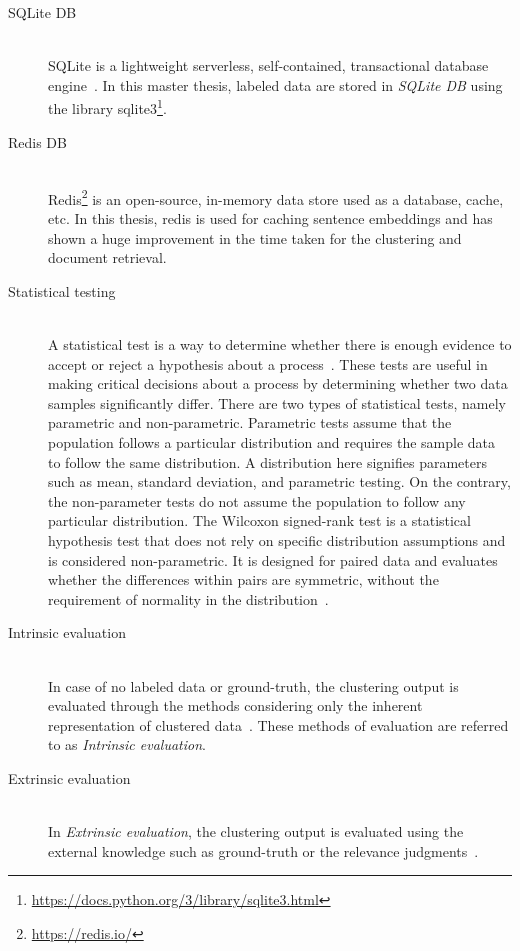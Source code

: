 \begin{description}
	
	\item[SQLite DB] \hfill \\ SQLite is a lightweight serverless, self-contained, transactional database engine~\cite{bhosale2015sqlite}. In this master thesis, labeled data are stored in \textit{SQLite DB} using the library sqlite3\footnote{\url{https://docs.python.org/3/library/sqlite3.html}}.
	
	\item[Redis DB] \hfill \\  Redis\footnote{\url{https://redis.io/}} is an open-source, in-memory data store used as a database, cache, etc. In this thesis, redis is used for caching sentence embeddings and has shown a huge improvement in the time taken for the clustering and document retrieval.
	
	
	\item[Statistical testing] \hfill \\ A statistical test is a way to determine whether there is enough evidence
	to accept or reject a hypothesis about a process~\cite{kaur2015comparative}. These tests are useful in
	making critical decisions about a process by determining whether two data samples significantly
	differ. There are two types of statistical tests, namely parametric
	and non-parametric. Parametric tests assume that the population follows a particular distribution and requires the sample data to follow the same distribution. A distribution
	here signifies parameters such as mean, standard deviation, and parametric
	testing. On the contrary, the non-parameter tests do not assume the population to follow
	any particular distribution. The Wilcoxon signed-rank test is a statistical hypothesis test that does not rely on specific distribution assumptions and is considered non-parametric. It is designed for paired data and evaluates whether the differences within pairs are symmetric, without the requirement of normality in the distribution~\cite{oyeka2012modified}.
	
	\item[Intrinsic evaluation] \hfill \\ In case of no labeled data or ground-truth, the clustering output is evaluated through the methods considering only the inherent representation of clustered data~\cite{de2012document}. These methods of evaluation are referred to as \textit{Intrinsic evaluation}. 
	
	\item[Extrinsic evaluation] \hfill \\ In \textit{Extrinsic evaluation}, the clustering output is evaluated using the external knowledge such as ground-truth or the relevance judgments~\cite{de2012document}. 
	

\end{description}
